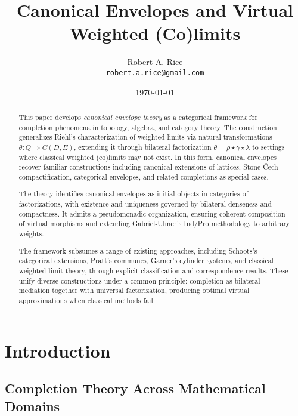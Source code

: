 \documentclass[11pt]{article}
\title{Canonical Envelopes and Virtual Weighted (Co)limits}
\author{Robert A. Rice\\
\texttt{robert.a.rice@gmail.com}}
\date{\today}
\theoremstyle{plain}
\theoremstyle{definition}
\theoremstyle{remark}
\begin{document}
\maketitle

\begin{abstract}
This paper develops \emph{canonical envelope theory} as a categorical framework for completion phenomena in topology, algebra, and category theory.  
The construction generalizes Riehl's characterization of weighted limits via natural transformations $\theta : Q \Rightarrow C(D,E)$, extending it through bilateral factorization $\theta = \rho \star \gamma \star \lambda$ to settings where classical weighted (co)limits may not exist.  
In this form, canonical envelopes recover familiar constructions-including canonical extensions of lattices, Stone-\v{C}ech compactification, categorical envelopes, and related completions-as special cases.

The theory identifies canonical envelopes as initial objects in categories of factorizations, with existence and uniqueness governed by bilateral denseness and compactness.  It admits a pseudomonadic organization, ensuring coherent composition of virtual morphisms and extending Gabriel-Ulmer's Ind/Pro methodology to arbitrary weights.

The framework subsumes a range of existing approaches, including Schoots's categorical extensions, Pratt's communes, Garner's cylinder systems, and classical weighted limit theory, through explicit classification and correspondence results. These unify diverse constructions under a common principle: completion as bilateral mediation together with universal factorization, producing optimal virtual approximations when classical methods fail.
\end{abstract}

\section{Introduction}

\subsection{Completion Theory Across Mathematical Domains}
\end{document}
